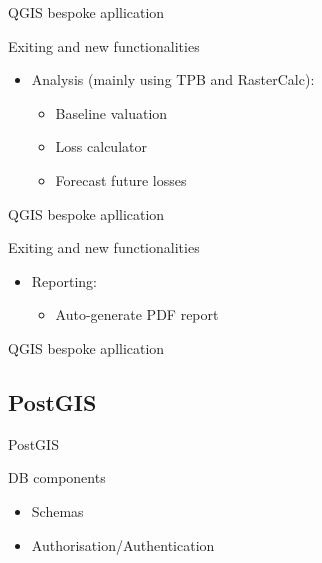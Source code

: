 \begin{frame}{QGIS bespoke apllication}
	\begin{block}{Exiting and new functionalities}
		\begin{itemize}
			\item Analysis (mainly using TPB and RasterCalc):
			\begin{itemize}
				\item Baseline valuation
				\item Loss calculator
				\item Forecast future losses
			\end{itemize}
		\end{itemize}
	\end{block}
\end{frame}

\begin{frame}{QGIS bespoke apllication}
	\begin{block}{Exiting and new functionalities}
		\begin{itemize}
			\item Reporting:
			\begin{itemize}
				\item Auto-generate PDF report
			\end{itemize}
		\end{itemize}
	\end{block}
\end{frame}

\begin{frame}{QGIS bespoke apllication}
\end{frame}

\subsection{PostGIS}
\begin{frame}{PostGIS}
	\begin{block}{DB components}
		\begin{itemize}
			\item Schemas
			\item Authorisation/Authentication
		\end{itemize}
	\end{block}
\end{frame}


